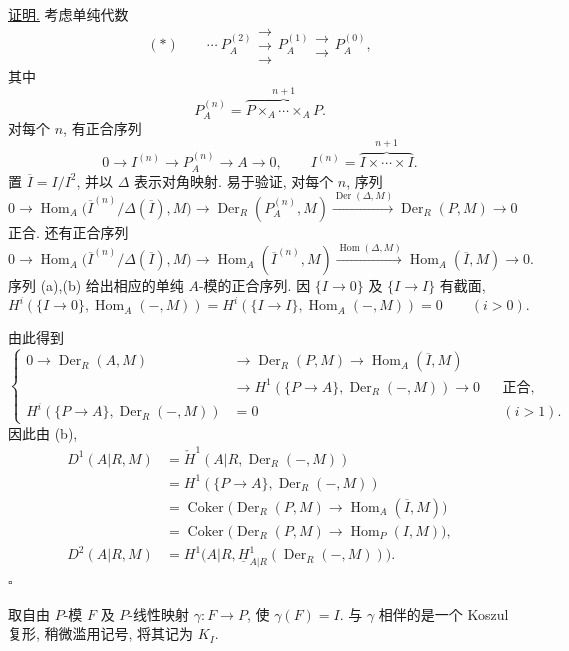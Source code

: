 \underline{证明.} 考虑单纯代数
\[
 (*)\qquad
 \cdots\ P_A^{(2)}
 \mathrel{\substack{\longrightarrow\\[-.6ex]\longrightarrow\\[-.6ex]\longrightarrow}}
 P_A^{(1)}
 \mathrel{\substack{\longrightarrow\\[-.6ex]\longrightarrow}}
 P_A^{(0)},
\]
其中
\[
 P_A^{(n)}=
 \overbrace{P\times_A\cdots\times_AP}^{n+1}.
\]
对每个 $n$, 有正合序列
\[
 0\longrightarrow I^{(n)}\longrightarrow P_A^{(n)}
 \longrightarrow A\longrightarrow0,
 \qquad
 I^{(n)}=\overbrace{I\times\cdots\times I}^{n+1}.
\]
置 $\overline I=I/I^2$, 并以 $\Delta$ 表示对角映射.
易于验证, 对每个 $n$, 序列
\[
 0\longrightarrow
 \operatorname{Hom}_A
 \bigl(\overline I^{(n)}/\Delta(\overline I),M\bigr)
 \longrightarrow\operatorname{Der}_R(P_A^{(n)},M)
 \xrightarrow{\operatorname{Der}(\Delta,M)}
 \operatorname{Der}_R(P,M)\longrightarrow0
 \tag{a}
\]
正合. 还有正合序列
\[
 0\longrightarrow
 \operatorname{Hom}_A
 \bigl(\overline I^{(n)}/\Delta(\overline I),M\bigr)
 \longrightarrow\operatorname{Hom}_A(\overline I^{(n)},M)
 \xrightarrow{\operatorname{Hom}(\Delta,M)}
 \operatorname{Hom}_A(\overline I,M)\longrightarrow0.
 \tag{b}
\]
序列 (a),(b) 给出相应的单纯 $A$-模的正合序列.
因 $\{I\longrightarrow0\}$ 及 $\{I\longrightarrow I\}$ 有截面,
\[
 H^i(\{I\longrightarrow0\},\operatorname{Hom}_A(-,M))
 =H^i(\{I\longrightarrow I\},\operatorname{Hom}_A(-,M))=0
 \qquad(i>0).
\]


由此得到
\[
\left\{
\begin{aligned}
0\longrightarrow\operatorname{Der}_R(A,M)
&\longrightarrow\operatorname{Der}_R(P,M)
\longrightarrow\operatorname{Hom}_A(\overline I,M)\\
&\longrightarrow
H^1(\{P\longrightarrow A\},\operatorname{Der}_R(-,M))
\longrightarrow0
&&\text{正合},\\
H^i(\{P\longrightarrow A\},\operatorname{Der}_R(-,M))
&=0 &&(i>1).
\end{aligned}
\right.
\]
因此由 (b),
\begin{align*}
D^1(A|R,M)
 &=\check H^1(A|R,\operatorname{Der}_R(-,M))\\
 &=H^1(\{P\longrightarrow A\},\operatorname{Der}_R(-,M))\\
 &=\operatorname{Coker}\bigl(
   \operatorname{Der}_R(P,M)\longrightarrow
   \operatorname{Hom}_A(\overline I,M)\bigr)\\
 &=\operatorname{Coker}\bigl(
   \operatorname{Der}_R(P,M)\longrightarrow
   \operatorname{Hom}_P(I,M)\bigr),\\
D^2(A|R,M)
 &=H^1\bigl(A|R,
   \underline H^1_{A|R}(\operatorname{Der}_R(-,M))\bigr).
\end{align*}
\hfill$\square$

取自由 $P$-模 $F$ 及 $P$-线性映射 $\gamma:F\longrightarrow P$,
使 $\gamma(F)=I$. 与 $\gamma$ 相伴的是一个 Koszul 复形,
稍微滥用记号, 将其记为 $K_I$.

